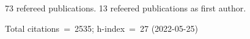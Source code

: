 73 refereed publications. 13 refeered publications as first author.

Total citations~=~2535; h-index~=~27 (2022-05-25)